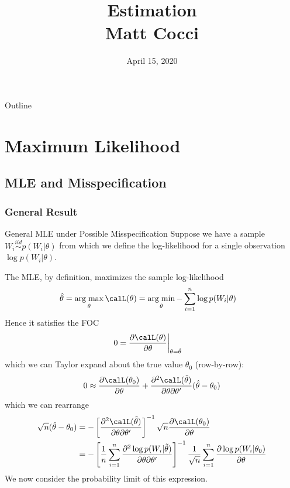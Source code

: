 \documentclass[aspectratio=169, handout]{beamer}
\title[]{Estimation \\ Matt Cocci}
\author[]{}
\date{April 15, 2020}
\DeclareMathOperator*{\argmin}{arg\;min}
\DeclareMathOperator*{\argmax}{arg\;max}
\newcommand{\iid}{\overset{iid}{\sim}}
\newcommand{\sumin}{\sum^n_{i=1}}
\begin{document}
\begin{frame}[plain]
\titlepage
\end{frame}


\begin{frame}{Outline}
\tableofcontents[hideallsubsections]
\end{frame}



\section{Maximum Likelihood}

\subsection{MLE and Misspecification}

\subsubsection{General Result}

{\scriptsize
\begin{frame}{General MLE under Possible Misspecification}
Suppose we have a sample $W_i\iid p(W_i|\theta)$ from which we define
the log-likelihood for a single observation
$\log p(W_i|\theta)$.

The MLE, by definition, maximizes the sample log-likelihood
\begin{align*}
  \hat{\theta}
  &=
  \argmax_\theta
  \calL(\theta)
  =
  \argmin_\theta
  -
  \sumin
  \log p(W_i|\theta)
\end{align*}
Hence it satisfies the FOC 
\begin{align*}
  0
  &=
  \frac{\partial \calL(\theta)}{\partial \theta}
  \bigg|_{\theta=\hat{\theta}}
\end{align*}
which we can Taylor expand about the true value $\theta_0$ (row-by-row):
\begin{align*}
  0
  \approx
  \frac{\partial \calL(\theta_0)}{\partial \theta}
  +
  \frac{\partial^2 \calL(\tilde{\theta})}{\partial \theta\partial\theta'}
  (\hat{\theta}-\theta_0)
\end{align*}
which we can rearrange
\begin{align*}
  \sqrt{n} (\hat{\theta}-\theta_0)
  &=
  -
  \left[
  \frac{\partial^2 \calL(\tilde{\theta})}{\partial \theta\partial\theta'}
  \right]^{-1}
  \sqrt{n}
  \frac{\partial \calL(\theta_0)}{\partial \theta}
  \\
  &=
  -
  \left[
  \frac{1}{n}
  \sumin
  \frac{\partial^2 \log p(W_i|\tilde{\theta})}{\partial \theta\partial\theta'}
  \right]^{-1}
  \frac{1}{\sqrt{n}}
  \sumin
  \frac{\partial \log p(W_i|\theta_0)}{\partial \theta}
\end{align*}
We now consider the probability limit of this expression.
\end{frame}
}
\end{document}
